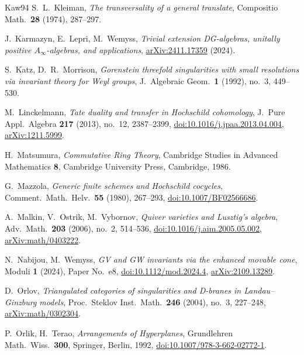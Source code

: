 \documentclass[11pt]{amsart}
\numberwithin{table}{section}
\numberwithin{figure}{section}
\numberwithin{equation}{section}
\theoremstyle{definition}
\theoremstyle{plain}
\begin{document}
\begin{thebibliography}{Kaw94}
S.~L.~Kleiman, \emph{The transversality of a general translate}, Compositio Math.\ \textbf{28} (1974), 287--297.

J.~Karmazyn, E.~Lepri, M.~Wemyss, \emph{Trivial extension DG-algebras, unitally positive $A_\infty$-algebras, and applications}, \href{https://arxiv.org/abs/2411.17359}{arXiv:2411.17359} (2024).

S.~Katz, D.~R.~Morrison, \emph{Gorenstein threefold singularities with small resolutions via invariant theory for Weyl groups}, J.\ Algebraic Geom.\ \textbf{1} (1992), no.~3, 449--530.

M.~Linckelmann, \emph{Tate duality and transfer in Hochschild cohomology}, J.\ Pure Appl.\ Algebra \textbf{217} (2013), no.~12, 2387--2399, \href{https://doi.org/10.1016/j.jpaa.2013.04.004}{doi:10.1016/j.jpaa.2013.04.004}, \href{https://arxiv.org/abs/1211.5999}{arXiv:1211.5999}.

H.~Matsumura, \emph{Commutative Ring Theory}, Cambridge Studies in Advanced Mathematics \textbf{8}, Cambridge University Press, Cambridge, 1986.

G.~Mazzola, \emph{Generic finite schemes and Hochschild cocycles}, Comment.\ Math.\ Helv.\ \textbf{55} (1980), 267--293, \href{https://doi.org/10.1007/BF02566686}{doi:10.1007/BF02566686}.

A.~Malkin, V.~Ostrik, M.~Vybornov, \emph{Quiver varieties and Lusztig's algebra}, Adv.\ Math.\ \textbf{203} (2006), no.~2, 514--536, \href{https://doi.org/10.1016/j.aim.2005.05.002}{doi:10.1016/j.aim.2005.05.002}, \href{https://arxiv.org/abs/math/0403222}{arXiv:math/0403222}.

N.~Nabijou, M.~Wemyss, \emph{GV and GW invariants via the enhanced movable cone}, Moduli \textbf{1} (2024), Paper No.~e8, \href{https://doi.org/10.1112/mod.2024.4}{doi:10.1112/mod.2024.4}, \href{https://arxiv.org/abs/2109.13289}{arXiv:2109.13289}.

D.~Orlov, \emph{Triangulated categories of singularities and D-branes in Landau--Ginzburg models}, Proc.\ Steklov Inst.\ Math.\ \textbf{246} (2004), no.~3, 227--248, \href{https://arxiv.org/abs/math/0302304}{arXiv:math/0302304}.

P.~Orlik, H.~Terao, \emph{Arrangements of Hyperplanes}, Grundlehren Math.\ Wiss.\ \textbf{300}, Springer, Berlin, 1992, \href{https://doi.org/10.1007/978-3-662-02772-1}{doi:10.1007/978-3-662-02772-1}.


\end{thebibliography}
\end{document}
